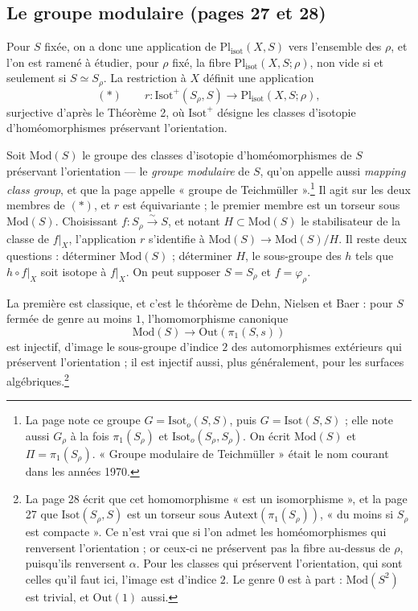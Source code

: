\documentclass[11pt,a4paper]{article}
\begin{document}
\subsection*{Le groupe modulaire (pages 27 et 28)}

Pour $S$ fixée, on a donc une application de $\mathrm{Pl}_{\mathrm{isot}}(X, S)$
vers l'ensemble des $\rho$, et l'on est ramené à étudier, pour $\rho$ fixé, la
fibre $\mathrm{Pl}_{\mathrm{isot}}(X, S; \rho)$, non vide si et seulement si
$S \simeq S_\rho$. La restriction à $X$ définit une application
\[
(*)\qquad r : \mathrm{Isot}^{+}(S_\rho, S) \longrightarrow \mathrm{Pl}_{\mathrm{isot}}(X, S; \rho),
\]
surjective d'après le Théorème 2, où $\mathrm{Isot}^{+}$ désigne les classes
d'isotopie d'homéomorphismes préservant l'orientation.

Soit $\mathrm{Mod}(S)$ le groupe des classes d'isotopie d'homéomorphismes de
$S$ préservant l'orientation --- le \emph{groupe modulaire} de $S$, qu'on
appelle aussi \emph{mapping class group}, et que la page appelle « groupe de
Teichmüller ».\footnote{La page note ce groupe $G = \mathrm{Isot}_o(S,S)$,
puis $G = \mathrm{Isot}(S,S)$ ; elle note aussi $G_\rho$ à la fois
$\pi_1(S_\rho)$ et $\mathrm{Isot}_o(S_\rho, S_\rho)$. On écrit
$\mathrm{Mod}(S)$ et $\Pi = \pi_1(S_\rho)$. « Groupe modulaire de
Teichmüller » était le nom courant dans les années 1970.} Il agit sur les deux
membres de $(*)$, et $r$ est équivariante ; le premier membre est un torseur
sous $\mathrm{Mod}(S)$. Choisissant $f : S_\rho \xrightarrow{\sim} S$, et
notant $H \subset \mathrm{Mod}(S)$ le stabilisateur de la classe de
$f|_X$, l'application $r$ s'identifie à
$\mathrm{Mod}(S) \to \mathrm{Mod}(S)/H$. Il reste deux questions : déterminer
$\mathrm{Mod}(S)$ ; déterminer $H$, le sous-groupe des $h$ tels que
$h \circ f|_X$ soit isotope à $f|_X$. On peut supposer $S = S_\rho$ et
$f = \varphi_\rho$.

La première est classique, et c'est le théorème de Dehn, Nielsen et Baer :
pour $S$ fermée de genre au moins $1$, l'homomorphisme canonique
\[
\mathrm{Mod}(S) \longrightarrow \mathrm{Out}(\pi_1(S, s))
\]
est injectif, d'image le sous-groupe d'indice $2$ des automorphismes
extérieurs qui préservent l'orientation ; il est injectif aussi, plus
généralement, pour les surfaces algébriques.\footnote{La page 28 écrit que
cet homomorphisme « est un isomorphisme », et la page 27 que
$\mathrm{Isot}(S_\rho, S)$ est un torseur sous
$\mathrm{Autext}(\pi_1(S_\rho))$, « du moins si $S_\rho$ est compacte ». Ce
n'est vrai que si l'on admet les homéomorphismes qui renversent
l'orientation ; or ceux-ci ne préservent pas la fibre au-dessus de $\rho$,
puisqu'ils renversent $\alpha$. Pour les classes qui préservent
l'orientation, qui sont celles qu'il faut ici, l'image est d'indice $2$. Le
genre $0$ est à part : $\mathrm{Mod}(S^{2})$ est trivial, et
$\mathrm{Out}(1)$ aussi.}
\end{document}
